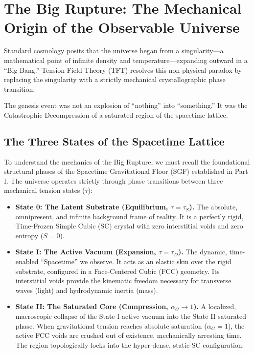 \chapter{The Big Rupture: The Mechanical Origin of the Observable Universe}
\label{chap:the_big_rupture}

Standard cosmology posits that the universe began from a singularity---a mathematical point of infinite density and temperature---expanding outward in a ``Big Bang.'' Tension Field Theory (TFT) resolves this non-physical paradox by replacing the singularity with a strictly mechanical crystallographic phase transition.

The genesis event was not an explosion of ``nothing'' into ``something.'' It was the Catastrophic Decompression of a saturated region of the spacetime lattice.

\section{The Three States of the Spacetime Lattice}
To understand the mechanics of the Big Rupture, we must recall the foundational structural phases of the Spacetime Gravitational Floor (SGF) established in Part I. The universe operates strictly through phase transitions between three mechanical tension states ($\tau$):

\begin{itemize}
    \item \textbf{State 0: The Latent Substrate (Equilibrium, $\tau = \tau_S$).} The absolute, omnipresent, and infinite background frame of reality. It is a perfectly rigid, Time-Frozen Simple Cubic (SC) crystal with zero interstitial voids and zero entropy ($S = 0$).
    \item \textbf{State I: The Active Vacuum (Expansion, $\tau = \tau_D$).} The dynamic, time-enabled ``Spacetime'' we observe. It acts as an elastic skin over the rigid substrate, configured in a Face-Centered Cubic (FCC) geometry. Its interstitial voids provide the kinematic freedom necessary for transverse waves (light) and hydrodynamic inertia (mass).
    \item \textbf{State II: The Saturated Core (Compression, $\alpha_G \to 1$).} A localized, macroscopic collapse of the State I active vacuum into the State II saturated phase. When gravitational tension reaches absolute saturation ($\alpha_G = 1$), the active FCC voids are crushed out of existence, mechanically arresting time. The region topologically locks into the hyper-dense, static SC configuration.
\end{itemize}

